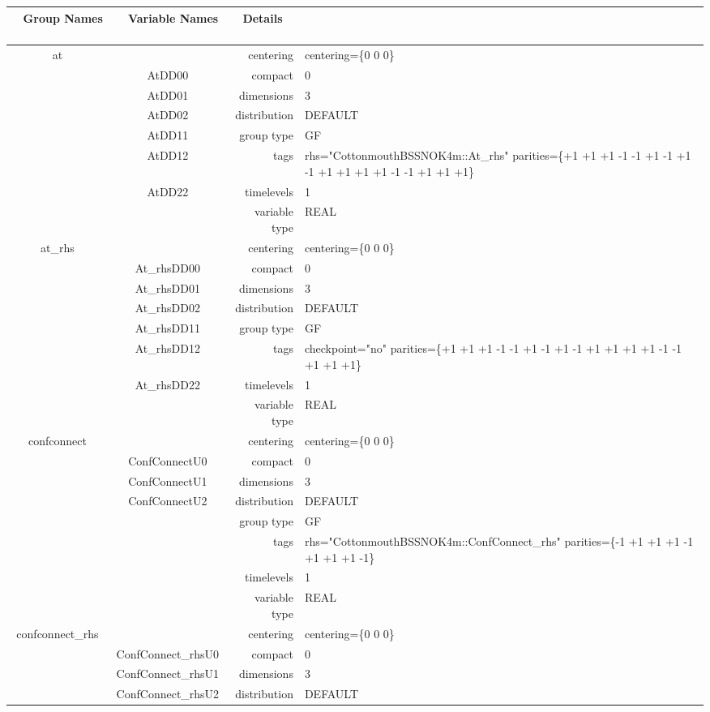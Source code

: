 \documentclass{article}
\begin{document}
\begin{tabular*}{150mm}{|c|c@{\extracolsep{\fill}}|rl|} \hline 
~ {\bf Group Names} ~ & ~ {\bf Variable Names} ~  &{\bf Details} ~ & ~\\ 
\hline 
at &  & centering & centering=\{0 0 0\} \\ 
 & AtDD00 & compact & 0 \\ 
 & AtDD01 & dimensions & 3 \\ 
 & AtDD02 & distribution & DEFAULT \\ 
 & AtDD11 & group type & GF \\ 
 & AtDD12 & tags & rhs="CottonmouthBSSNOK4m::At\_rhs" parities=\{+1 +1 +1  -1 -1 +1  -1 +1 -1  +1 +1 +1  +1 -1 -1  +1 +1 +1\} \\ 
 & AtDD22 & timelevels & 1 \\ 
 &  & variable type & REAL \\ 
\hline 
at\_rhs &  & centering & centering=\{0 0 0\} \\ 
 & At\_rhsDD00 & compact & 0 \\ 
 & At\_rhsDD01 & dimensions & 3 \\ 
 & At\_rhsDD02 & distribution & DEFAULT \\ 
 & At\_rhsDD11 & group type & GF \\ 
 & At\_rhsDD12 & tags & checkpoint="no" parities=\{+1 +1 +1  -1 -1 +1  -1 +1 -1  +1 +1 +1  +1 -1 -1  +1 +1 +1\} \\ 
 & At\_rhsDD22 & timelevels & 1 \\ 
 &  & variable type & REAL \\ 
\hline 
confconnect &  & centering & centering=\{0 0 0\} \\ 
 & ConfConnectU0 & compact & 0 \\ 
 & ConfConnectU1 & dimensions & 3 \\ 
 & ConfConnectU2 & distribution & DEFAULT \\ 
 &  & group type & GF \\ 
 &  & tags & rhs="CottonmouthBSSNOK4m::ConfConnect\_rhs" parities=\{-1 +1 +1  +1 -1 +1  +1 +1 -1\} \\ 
 &  & timelevels & 1 \\ 
 &  & variable type & REAL \\ 
\hline 
confconnect\_rhs &  & centering & centering=\{0 0 0\} \\ 
 & ConfConnect\_rhsU0 & compact & 0 \\ 
 & ConfConnect\_rhsU1 & dimensions & 3 \\ 
 & ConfConnect\_rhsU2 & distribution & DEFAULT \\ 

\end{tabular*}
\end{document}
